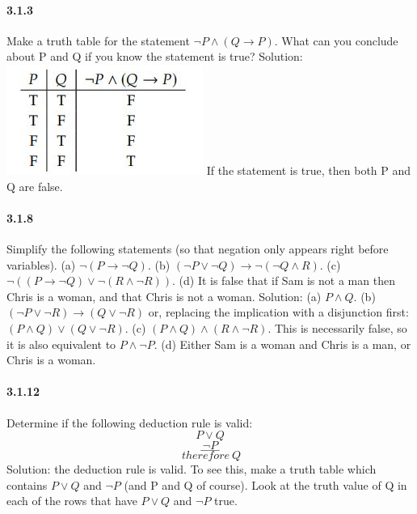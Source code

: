 \documentclass{article}
\begin{document}
\paragraph{3.1.3}
Make a truth table for the statement $\lnot P \land (Q \to P)$. What can you
conclude about P and Q if you know the statement is true?\newline
Solution:\newline
\includegraphics{3.1.3}\newline
If the statement is true, then both P and Q are false.
\paragraph{3.1.8}
Simplify the following statements (so that negation only appears right
before variables).\newline
(a) $\lnot(P \to \lnot Q)$.\newline
(b) $(\lnot P \lor \lnot Q) \to \lnot (\lnot Q \land R)$.\newline
(c) $\lnot((P \to \lnot Q) \lor \lnot(R \land \lnot R))$.\newline
(d) It is false that if Sam is not a man then Chris is a woman, and
that Chris is not a woman.\newline
Solution:\newline
(a) $P \land Q$.\newline
(b) $(\lnot P\lor \lnot R) \to (Q \lor \lnot R)$ or, replacing the implication with a disjunction
first: $(P \land Q) \lor (Q \lor \lnot R)$.\newline
(c) $(P \land Q) \land (R \land \lnot R)$. This is necessarily false, so it is also equivalent
to $P \land \lnot P$.\newline
(d) Either Sam is a woman and Chris is a man, or Chris is a woman.
\paragraph{3.1.12}
Determine if the following deduction rule is valid:
$$P \lor Q$$
$$\lnot P$$
$$\_\_\_\_\_$$
$$\ therefore\ Q$$
Solution:\newline
the deduction rule is valid. To see this, make a truth table which
contains $P \lor Q$ and $\lnot P$ (and P and Q of course). Look at the truth value of
Q in each of the rows that have $P \lor Q$ and $\lnot P$ true.
\end{document}

